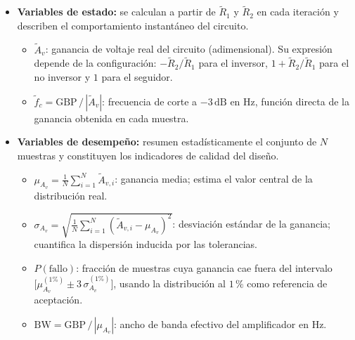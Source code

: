 ﻿\documentclass[12pt, letterpaper]{article}
\begin{document}
\begin{itemize}[leftmargin=2em]
    \item \textbf{Variables de estado:}
          se calculan a partir de \(\tilde{R}_1\) y \(\tilde{R}_2\) en cada
          iteración y describen el comportamiento instantáneo del circuito.

          \begin{itemize}[leftmargin=2em]
              \item \(\tilde{A}_v\): ganancia de voltaje real del circuito
                    (adimensional). Su expresión depende de la configuración:
                    \(-\tilde{R}_2/\tilde{R}_1\) para el inversor,
                    \(1 + \tilde{R}_2/\tilde{R}_1\) para el no inversor y
                    \(1\) para el seguidor.
              \item \(\tilde{f}_c = \mathrm{GBP}\,/\,|\tilde{A}_v|\): frecuencia
                    de corte a \(-3\,\text{dB}\) en Hz, función directa de la
                    ganancia obtenida en cada muestra.
          \end{itemize}

    \item \textbf{Variables de desempeño:}
          resumen estadísticamente el conjunto de \(N\) muestras y constituyen
          los indicadores de calidad del diseño.

          \begin{itemize}[leftmargin=2em]
              \item \(\mu_{A_v} = \tfrac{1}{N}\sum_{i=1}^{N}\tilde{A}_{v,i}\):
                    ganancia media; estima el valor central de la distribución real.
              \item \(\sigma_{A_v} = \sqrt{\tfrac{1}{N}\sum_{i=1}^{N}
                    \!\left(\tilde{A}_{v,i} - \mu_{A_v}\right)^{\!2}}\):
                    desviación estándar de la ganancia; cuantifica la dispersión
                    inducida por las tolerancias.
              \item \(P(\text{fallo})\): fracción de muestras cuya ganancia cae
                    fuera del intervalo
                    \(\bigl[\mu_{A_v}^{(1\text{\%})}\!\pm 3\,\sigma_{A_v}^{(1\text{\%})}\bigr]\),
                    usando la distribución al \(1\,\text{\%}\) como referencia de aceptación.
              \item \(\mathrm{BW} = \mathrm{GBP}\,/\,|\mu_{A_v}|\): ancho de banda
                    efectivo del amplificador en Hz.
          \end{itemize}

\end{itemize}
\end{document}
